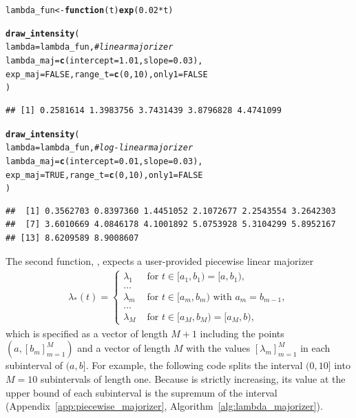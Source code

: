 \documentclass[article,nojss]{jss}\usepackage[]{graphicx}\usepackage[]{xcolor}
\makeatletter
\newcommand{\hlnum}[1]{\textcolor[rgb]{0.686,0.059,0.569}{#1}}%
\newcommand{\hlcom}[1]{\textcolor[rgb]{0.678,0.584,0.686}{\textit{#1}}}%
\newcommand{\hlopt}[1]{\textcolor[rgb]{0,0,0}{#1}}%
\newcommand{\hlstd}[1]{\textcolor[rgb]{0.345,0.345,0.345}{#1}}%
\newcommand{\hlkwa}[1]{\textcolor[rgb]{0.161,0.373,0.58}{\textbf{#1}}}%
\newcommand{\hlkwb}[1]{\textcolor[rgb]{0.69,0.353,0.396}{#1}}%
\newcommand{\hlkwc}[1]{\textcolor[rgb]{0.333,0.667,0.333}{#1}}%
\newcommand{\hlkwd}[1]{\textcolor[rgb]{0.737,0.353,0.396}{\textbf{#1}}}%
\newenvironment{kframe}{%
 \def\at@end@of@kframe{}%
 \ifinner\ifhmode%
  \def\at@end@of@kframe{\end{minipage}}%
  \begin{minipage}{\columnwidth}%
 \fi\fi%
 \def\FrameCommand##1{\hskip\@totalleftmargin \hskip-\fboxsep
 \colorbox{shadecolor}{##1}\hskip-\fboxsep
     \hskip-\linewidth \hskip-\@totalleftmargin \hskip\columnwidth}%
 \MakeFramed {\advance\hsize-\width
   \@totalleftmargin\z@ \linewidth\hsize
   \@setminipage}}%
 {\par\unskip\endMakeFramed%
 \at@end@of@kframe}
\newenvironment{knitrout}{}{} %
\newcommand{\fct}[1]{\code{#1()}}
\makeatother
\begin{document}
\begin{knitrout}
\color{fgcolor}\begin{kframe}
\begin{alltt}
\hlstd{lambda_fun} \hlkwb{<-} \hlkwa{function}\hlstd{(}\hlkwc{t}\hlstd{)} \hlkwd{exp}\hlstd{(}\hlnum{0.02} \hlopt{*} \hlstd{t)}

\hlkwd{draw_intensity}\hlstd{(}
  \hlkwc{lambda} \hlstd{= lambda_fun,} \hlcom{# linear majorizer}
  \hlkwc{lambda_maj} \hlstd{=} \hlkwd{c}\hlstd{(}\hlkwc{intercept} \hlstd{=} \hlnum{1.01}\hlstd{,} \hlkwc{slope} \hlstd{=} \hlnum{0.03}\hlstd{),}
  \hlkwc{exp_maj} \hlstd{=} \hlnum{FALSE}\hlstd{,} \hlkwc{range_t} \hlstd{=} \hlkwd{c}\hlstd{(}\hlnum{0}\hlstd{,} \hlnum{10}\hlstd{),} \hlkwc{only1} \hlstd{=} \hlnum{FALSE}
\hlstd{)}
\end{alltt}
\begin{verbatim}
## [1] 0.2581614 1.3983756 3.7431439 3.8796828 4.4741099
\end{verbatim}
\begin{alltt}
\hlkwd{draw_intensity}\hlstd{(}
  \hlkwc{lambda} \hlstd{= lambda_fun,} \hlcom{# log-linear majorizer}
  \hlkwc{lambda_maj} \hlstd{=} \hlkwd{c}\hlstd{(}\hlkwc{intercept} \hlstd{=} \hlnum{0.01}\hlstd{,} \hlkwc{slope} \hlstd{=} \hlnum{0.03}\hlstd{),}
  \hlkwc{exp_maj} \hlstd{=} \hlnum{TRUE}\hlstd{,} \hlkwc{range_t} \hlstd{=} \hlkwd{c}\hlstd{(}\hlnum{0}\hlstd{,} \hlnum{10}\hlstd{),} \hlkwc{only1} \hlstd{=} \hlnum{FALSE}
\hlstd{)}
\end{alltt}
\begin{verbatim}
##  [1] 0.3562703 0.8397360 1.4451052 2.1072677 2.2543554 3.2642303
##  [7] 3.6010669 4.0846178 4.1001892 5.0753928 5.3104299 5.8952167
## [13] 8.6209589 8.9008607
\end{verbatim}
\end{kframe}
\end{knitrout}


The second function, \fct{draw\_intensity\_step}, expects a user-provided piecewise linear majorizer
\begin{align*}
    \lambda_*(t) = \begin{cases}
    \lambda_1 &\textrm{ for } t \in [a_1, b_1) = [a, b_1), \\
    \dots &\\
    \lambda_m &\textrm{ for } t \in [a_m, b_m) \textrm{ with } a_{m} = b_{m-1}, \\
    \dots &\\
    \lambda_M &\textrm{ for } t \in [a_M, b_M) = [a_M, b),
    \end{cases}
\end{align*}
which is specified as a vector of length $M+1$ including the points $(a, [b_m]_{m=1}^M)$ and a vector of length $M$ with the values $[\lambda_m]_{m=1}^M$ in each subinterval of $(a, b]$. For example, the following code splits the interval $(0, 10]$ into $M=10$ subintervals of length one. Because \fct{lambda\_fun} is strictly increasing, its value at the upper bound of each subinterval is the supremum of the interval (Appendix~\ref{app:piecewise_majorizer}, Algorithm~\ref{alg:lambda_majorizer}).
\end{document}
